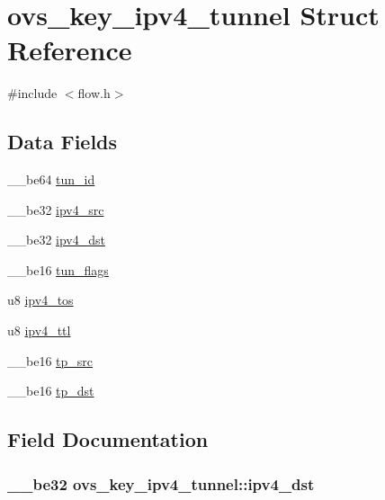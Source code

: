 \hypertarget{structovs__key__ipv4__tunnel}{}\section{ovs\+\_\+key\+\_\+ipv4\+\_\+tunnel Struct Reference}
\label{structovs__key__ipv4__tunnel}


{\ttfamily \#include $<$flow.\+h$>$}

\subsection*{Data Fields}
\begin{DoxyCompactItemize}
\item 
\+\_\+\+\_\+be64 \hyperlink{structovs__key__ipv4__tunnel_ae36132bc05ca6257b572edddffcb867a}{tun\+\_\+id}
\item 
\+\_\+\+\_\+be32 \hyperlink{structovs__key__ipv4__tunnel_a1e5a978f104d61e9694e914a109734a7}{ipv4\+\_\+src}
\item 
\+\_\+\+\_\+be32 \hyperlink{structovs__key__ipv4__tunnel_ae443d381a97f53bbc4139fe36c0aae30}{ipv4\+\_\+dst}
\item 
\+\_\+\+\_\+be16 \hyperlink{structovs__key__ipv4__tunnel_a7459e66ecf90329eb2fa6cf3fc4781db}{tun\+\_\+flags}
\item 
u8 \hyperlink{structovs__key__ipv4__tunnel_a69594eaf9d7dfc2824b264484e02498e}{ipv4\+\_\+tos}
\item 
u8 \hyperlink{structovs__key__ipv4__tunnel_a24de7472a8c22903fce96b73dab68a40}{ipv4\+\_\+ttl}
\item 
\+\_\+\+\_\+be16 \hyperlink{structovs__key__ipv4__tunnel_acda46848fad6a931296f3e7a74b44a18}{tp\+\_\+src}
\item 
\+\_\+\+\_\+be16 \hyperlink{structovs__key__ipv4__tunnel_a438707be6be24ab62236063bde726e9b}{tp\+\_\+dst}
\end{DoxyCompactItemize}


\subsection{Field Documentation}
\hypertarget{structovs__key__ipv4__tunnel_ae443d381a97f53bbc4139fe36c0aae30}{}
\subsubsection[{ipv4\+\_\+dst}]{\setlength{\rightskip}{0pt plus 5cm}\+\_\+\+\_\+be32 ovs\+\_\+key\+\_\+ipv4\+\_\+tunnel\+::ipv4\+\_\+dst}\label{structovs__key__ipv4__tunnel_ae443d381a97f53bbc4139fe36c0aae30}
\hypertarget{structovs__key__ipv4__tunnel_a1e5a978f104d61e9694e914a109734a7}{}
